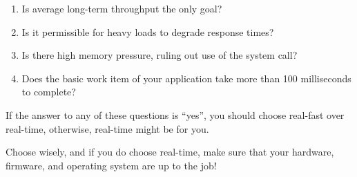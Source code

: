 \begin{enumerate}
\item	Is average long-term throughput the only goal?
\item	Is it permissible for heavy loads to degrade response times?
\item	Is there high memory pressure, ruling out use of
	the  system call?
\item	Does the basic work item of your application take more than
	100 milliseconds to complete?
\end{enumerate}

If the answer to any of these questions is ``yes'', you should choose
real-fast over real-time, otherwise, real-time might be for you.

Choose wisely, and if you do choose real-time, make sure that your
hardware, firmware, and operating system are up to the job!

